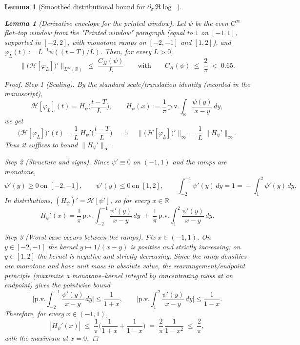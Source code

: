 \documentclass[11pt]{article}
\newtheorem{lemma}[theorem]{Lemma}
\theoremstyle{definition}
\theoremstyle{remark}
\DeclareMathOperator{\dettwo}{det_2}
\begin{document}
\begin{lemma}[Smoothed distributional bound for $\partial_\sigma\,\Re\log\dettwo$]
\begin{lemma}[Derivative envelope for the printed window]\label{lem:CH-derivative-explicit}
Let $\psi$ be the even $C^\infty$ flat--top window from the "Printed window" paragraph (equal to $1$ on $[-1,1]$, supported in $[-2,2]$, with monotone ramps on $[-2,-1]$ and $[1,2]$), and $\varphi_L(t):=L^{-1}\psi((t-T)/L)$. Then, for every $L>0$,
\[
  \big\|\big(\mathcal H[\varphi_L]\big)'\big\|_{L^\infty(\mathbb R)} \;\le\; \frac{C_H(\psi)}{L}
  \qquad\text{with}\qquad C_H(\psi)\;\le\;\frac{2}{\pi}\;<\;0.65.
\]
\begin{proof}
\textit{Step 1 (Scaling).} By the standard scale/translation identity (recorded in the manuscript),
\[
  \mathcal H[\varphi_L](t)=H_\psi\!\Big(\frac{t-T}{L}\Big),\qquad
  H_\psi(x):=\frac{1}{\pi}\,\mathrm{p.v.}\!\int_{\mathbb R}\frac{\psi(y)}{x-y}\,dy,
\]
we get
\[
  \big(\mathcal H[\varphi_L]\big)'(t)=\frac{1}{L}\,H_\psi'\!\Big(\frac{t-T}{L}\Big)
  \quad\Longrightarrow\quad
  \big\|\big(\mathcal H[\varphi_L]\big)'\big\|_\infty=\frac{1}{L}\,\|H_\psi'\|_\infty.
\]
Thus it suffices to bound $\|H_\psi'\|_\infty$.

\smallskip
\textit{Step 2 (Structure and signs).} Since $\psi'\equiv0$ on $(-1,1)$ and the ramps are monotone,
\[
  \psi'(y)\ge0\ \text{on }[-2,-1],\qquad \psi'(y)\le0\ \text{on }[1,2],\qquad
  \int_{-2}^{-1}\psi'(y)\,dy=1=\!-\!\int_{1}^{2}\psi'(y)\,dy.
\]
In distributions, $(H_\psi)'= \mathcal H[\psi']$, so for every $x\in\mathbb R$
\[
  H_\psi'(x)=\frac{1}{\pi}\,\mathrm{p.v.}\!\int_{-2}^{-1}\frac{\psi'(y)}{x-y}\,dy\;+\;
             \frac{1}{\pi}\,\mathrm{p.v.}\!\int_{1}^{2}\frac{\psi'(y)}{x-y}\,dy.
\]

\smallskip
\textit{Step 3 (Worst case occurs between the ramps).} Fix $x\in(-1,1)$.  On $y\in[-2,-1]$ the kernel $y\mapsto 1/(x-y)$ is positive and strictly increasing; on $y\in[1,2]$ the kernel is negative and strictly decreasing.  Since the ramp densities are monotone and have unit mass in absolute value, the rearrangement/endpoint principle (maximize a monotone–kernel integral by concentrating mass at an endpoint) gives the pointwise bound
\[
  \Big|\mathrm{p.v.}\!\int_{-2}^{-1}\frac{\psi'(y)}{x-y}\,dy\Big|
  \le \frac{1}{1+x},\qquad
  \Big|\mathrm{p.v.}\!\int_{1}^{2}\frac{\psi'(y)}{x-y}\,dy\Big|
  \le \frac{1}{1-x}.
\]
Therefore, for every $x\in(-1,1)$,
\[
  |H_\psi'(x)| \;\le\; \frac{1}{\pi}\Big(\frac{1}{1+x}+\frac{1}{1-x}\Big)
  \;=\; \frac{2}{\pi}\,\frac{1}{1-x^2}
  \;\le\; \frac{2}{\pi},
\]
with the maximum at $x=0$.


\end{proof}
\end{lemma}
\end{lemma}
\end{document}
